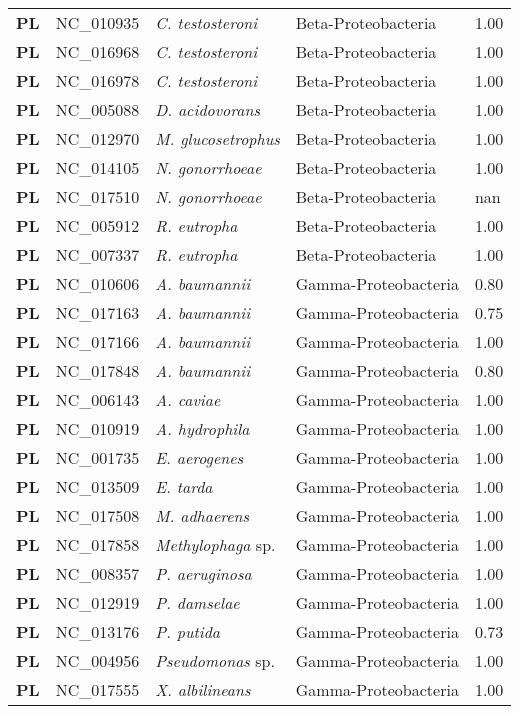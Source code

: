 \begin{adjustwidth}{-3cm}{2cm}
{\begin{supertabular}{>{\bfseries}l|p{0.1\textwidth}p{0.14\textwidth}l|l}
PL & NC\_010935 & \textit{C. testosteroni} & Beta-Proteobacteria & 1.00\\
PL & NC\_016968 & \textit{C. testosteroni} & Beta-Proteobacteria & 1.00\\
PL & NC\_016978 & \textit{C. testosteroni} & Beta-Proteobacteria & 1.00\\
PL & NC\_005088 & \textit{D. acidovorans} & Beta-Proteobacteria & 1.00\\
PL & NC\_012970 & \textit{M. glucosetrophus} & Beta-Proteobacteria & 1.00\\
PL & NC\_014105 & \textit{N. gonorrhoeae} & Beta-Proteobacteria & 1.00\\
PL & NC\_017510 & \textit{N. gonorrhoeae} & Beta-Proteobacteria & nan\\
PL & NC\_005912 & \textit{R. eutropha} & Beta-Proteobacteria & 1.00\\
PL & NC\_007337 & \textit{R. eutropha} & Beta-Proteobacteria & 1.00\\
PL & NC\_010606 & \textit{A. baumannii} & Gamma-Proteobacteria & 0.80\\
PL & NC\_017163 & \textit{A. baumannii} & Gamma-Proteobacteria & 0.75\\
PL & NC\_017166 & \textit{A. baumannii} & Gamma-Proteobacteria & 1.00\\
PL & NC\_017848 & \textit{A. baumannii} & Gamma-Proteobacteria & 0.80\\
PL & NC\_006143 & \textit{A. caviae} & Gamma-Proteobacteria & 1.00\\
PL & NC\_010919 & \textit{A. hydrophila} & Gamma-Proteobacteria & 1.00\\
PL & NC\_001735 & \textit{E. aerogenes} & Gamma-Proteobacteria & 1.00\\
PL & NC\_013509 & \textit{E. tarda} & Gamma-Proteobacteria & 1.00\\
PL & NC\_017508 & \textit{M. adhaerens} & Gamma-Proteobacteria & 1.00\\
PL & NC\_017858 & \textit{Methylophaga} sp. & Gamma-Proteobacteria & 1.00\\
PL & NC\_008357 & \textit{P. aeruginosa} & Gamma-Proteobacteria & 1.00\\
PL & NC\_012919 & \textit{P. damselae} & Gamma-Proteobacteria & 1.00\\
PL & NC\_013176 & \textit{P. putida} & Gamma-Proteobacteria & 0.73\\
PL & NC\_004956 & \textit{Pseudomonas} sp. & Gamma-Proteobacteria & 1.00\\
PL & NC\_017555 & \textit{X. albilineans} & Gamma-Proteobacteria & 1.00\\

\end{supertabular}}
\end{adjustwidth}
